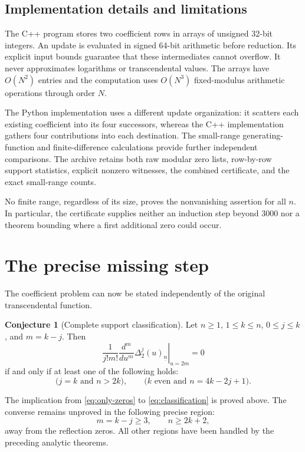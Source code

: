 \documentclass[11pt]{article}
\numberwithin{equation}{section}
\theoremstyle{definition}
\newtheorem{conjecture}[theorem]{Conjecture}
\theoremstyle{remark}
\newcommand{\fall}[2]{(#1)_{\underline{#2}}}
\begin{document}
\subsection{Implementation details and limitations}
The C++ program stores two coefficient rows in arrays of unsigned
32-bit integers. An update is evaluated in signed 64-bit arithmetic
before reduction. Its explicit input bounds guarantee that these
intermediates cannot overflow. It never approximates logarithms or
transcendental values. The arrays have $O(N^2)$ entries and the computation
uses $O(N^3)$ fixed-modulus arithmetic operations through order $N$.

The Python implementation uses a different update organization: it
scatters each existing coefficient into its four successors, whereas
the C++ implementation gathers four contributions into each destination.
The small-range generating-function and finite-difference calculations
provide further independent comparisons. The archive retains both raw
modular zero lists, row-by-row support statistics, explicit nonzero
witnesses, the combined certificate, and the exact small-range counts.

No finite range, regardless of its size, proves the nonvanishing assertion
for all $n$. In particular, the certificate supplies neither an induction
step beyond $3000$ nor a theorem bounding where a first additional zero
could occur.

\section{The precise missing step}\label{sec:remaining}
The coefficient problem can now be stated independently of the original
transcendental function.
\begin{conjecture}[Complete support classification]\label{conj:support}
Let $n\ge1$, $1\le k\le n$, $0\le j\le k$, and $m=k-j$. Then
\begin{equation}\label{eq:classification}
 \frac{1}{j!m!}
 \left.\frac{d^m}{du^m}\Delta_2^j\fall{u}{n}\right|_{u=2m}=0
\end{equation}
if and only if at least one of the following holds:
\begin{equation}\label{eq:only-zeros}
 \bigl(j=k\text{ and }n>2k\bigr),
 \qquad
 \bigl(k\text{ even and }n=4k-2j+1\bigr).
\end{equation}
\end{conjecture}
The implication from \eqref{eq:only-zeros} to \eqref{eq:classification}
is proved above. The converse remains unproved in the following precise
region:
\begin{equation}\label{eq:gap-region}
 m=k-j\ge3,\qquad n\ge2k+2,
\end{equation}
away from the reflection zeros. All other regions have been handled by
the preceding analytic theorems.
\end{document}
